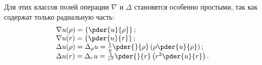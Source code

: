 	Для этих классов полей операции \( \nabla \) и \( \Delta \) становятся особенно простыми, так как содержат только радиальную часть:
	\[ \begin{array}{l}
	\nabla u(\rho) = \left\{ \pder{u}{\rho} \right\}; \\
	\nabla u(r) = \left\{ \pder{u}{r} \right\}; \\
	\Delta u(\rho) = \Delta_\rho u = \frac{1}{\rho}\pder{}{\rho}\left( \rho\pder{u}{\rho} \right); \\
	\Delta u(r) = \Delta_r u = \frac{1}{r^2}\pder{}{r}\left( r^2\pder{u}{r} \right).
	\end{array} \]
